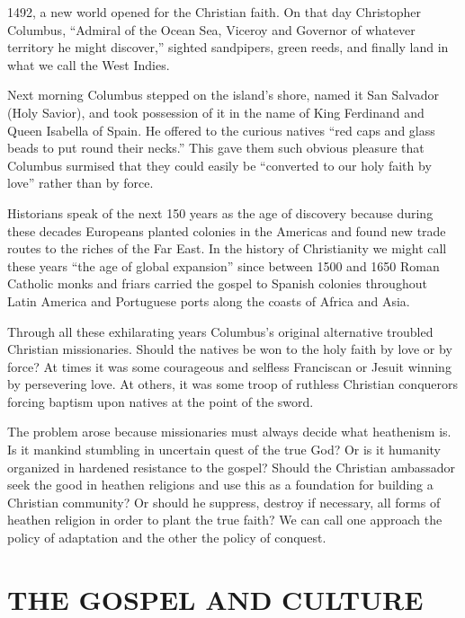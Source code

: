 
 1492, a new world opened for the Christian faith. On that day
Christopher Columbus, “Admiral of the Ocean Sea, Viceroy and Governor of whatever territory he might
discover,” sighted sandpipers, green reeds, and finally land in what we call the West Indies.

Next morning Columbus stepped on the island’s shore, named it San Salvador (Holy Savior), and took
possession of it in the name of King Ferdinand and Queen Isabella of Spain. He offered to the
curious natives “red caps and glass beads to put round their necks.” This gave them such obvious
pleasure that Columbus surmised that they could easily be “converted to our holy faith by love”
rather than by force.

Historians speak of the next 150 years as the age of discovery because during these decades
Europeans planted colonies in the Americas and found new trade routes to the riches of the Far East.
In the history of Christianity we might call these years “the age of global expansion” since between
1500 and 1650 Roman Catholic monks and friars carried the gospel to Spanish colonies throughout
Latin America and Portuguese ports along the coasts of Africa and Asia.

Through all these exhilarating years Columbus’s original alternative troubled Christian
missionaries. Should the natives be won to the holy faith by love or by force? At times it was some
courageous and selfless Franciscan or Jesuit winning by persevering love. At others, it was some
troop of ruthless Christian conquerors forcing baptism upon natives at the point of the sword.

The problem arose because missionaries must always decide what heathenism is. Is it mankind
stumbling in uncertain quest of the true God? Or is it humanity organized in hardened resistance to
the gospel? Should the Christian ambassador seek the good in heathen religions and use this as a
foundation for building a Christian community? Or should he suppress, destroy if necessary, all
forms of heathen religion in order to plant the true faith? We can call one approach the policy of
adaptation and the other the policy of conquest.

\section{THE GOSPEL AND CULTURE}

